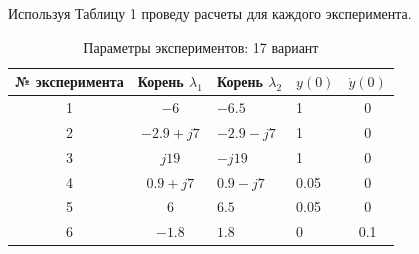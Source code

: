 \documentclass[a4paper,12pt]{article}
\begin{document}
	Используя Таблицу 1 проведу расчеты для каждого эксперимента.
	
	\begin{table}[H]
		\centering
		\caption{Параметры экспериментов: 17 вариант}
		\label{tab:experiment_parameters}
		\renewcommand{\arraystretch}{1.3}
		\begin{tabular}{@{}ccllc@{}}
			\toprule
			№ эксперимента & Корень \(\lambda_1\) & Корень \(\lambda_2\) & \(y(0)\) & \(\dot{y}(0)\) \\
			\midrule
			1 & \(-6\) & \(-6.5\) & 1 & 0 \\
			2 & \(-2.9 + j7\) & \(-2.9 - j7\) & 1 & 0 \\
			3 & \(j19\) & \(-j19\) & 1 & 0 \\
			4 & \(0.9 + j7\) & \(0.9 - j7\) & 0.05 & 0 \\
			5 & \(6\) & \(6.5\) & 0.05 & 0 \\
			6 & \(-1.8\) & \(1.8\) & 0 & 0.1 \\
			\bottomrule
		\end{tabular}
	\end{table}
	
\end{document}

